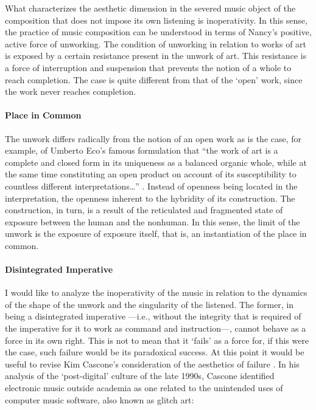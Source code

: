 What characterizes the aesthetic dimension in the severed music object of the composition that does not impose its own listening is inoperativity. In this sense, the practice of music composition can be understood in terms of Nancy's positive, active force of unworking. The condition of unworking in relation to works of art is exposed by a certain resistance present in the unwork of art. This resistance is a force of interruption and suspension that prevents the notion of a whole to reach completion. The case is quite different from that of the `open' work, since the work never reaches completion.

\paragraph{Place in Common}
The unwork differs radically from the notion of an open work as is the case, for example, of Umberto Eco's famous formulation that ``the work of art is a complete and closed form in its uniqueness as a balanced organic whole, while at the same time constituting an open product on account of its susceptibility to countless different interpretations\dots'' \parencite{Eco04:The}. Instead of openness being located in the interpretation, the openness inherent to the hybridity of its construction. The construction, in turn, is a result of the reticulated and fragmented state of exposure between the human and the nonhuman. In this sense, the limit of the unwork is the exposure of exposure itself, that is, an instantiation of the place in common.

\paragraph{Disintegrated Imperative}
I would like to analyze the inoperativity of the music in relation to the dynamics of the shape of the unwork and the singularity of the listened. The former, in being a disintegrated imperative ---i.e., without the integrity that is required of the imperative for it to work as command and instruction---, cannot behave as a force in its own right. This is not to mean that it `fails' as a force for, if this were the case, such failure would be its paradoxical success. At this point it would be useful to revise Kim Cascone's consideration of the aesthetics of failure \parencite{Cas00:The}. In his analysis of the `post-digital' culture of the late 1990s, Cascone identified electronic music outside academia as one related to the unintended uses of computer music software, also known as glitch art:


